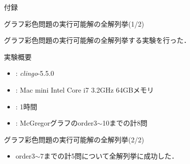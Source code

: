 \documentclass[dvipdfmx,11pt]{beamer}
\begin{document}

\begin{frame}[noframenumbering]{}
 \thispagestyle{empty}
 \Huge 付録
\end{frame}


\begin{frame}[noframenumbering]{グラフ彩色問題の実行可能解の全解列挙(1/2)}
 \thispagestyle{empty}

 \begin{block}{}
  グラフ彩色問題の実行可能解の全解列挙する実験を行った．  
 \end{block}

 \begin{block}{実験概要}
  \begin{itemize}
   \item {}: \textit{clingo}-5.5.0
   \item {}: Mac mini Intel Core i7 3.2GHz 64GBメモリ
   \item {}: 1時間
   \item {}: McGregorグラフのorder3$\sim$10までの計8問
  \end{itemize}
 \end{block}
\end{frame}


\begin{frame}[noframenumbering]{グラフ彩色問題の実行可能解の全解列挙(2/2)}
 \thispagestyle{empty}

 \begin{center}
  
 \end{center}

 \begin{itemize}
  \item order3$\sim$7までの計5問について全解列挙に成功した．
 \end{itemize}
\end{frame}

\end{document}
